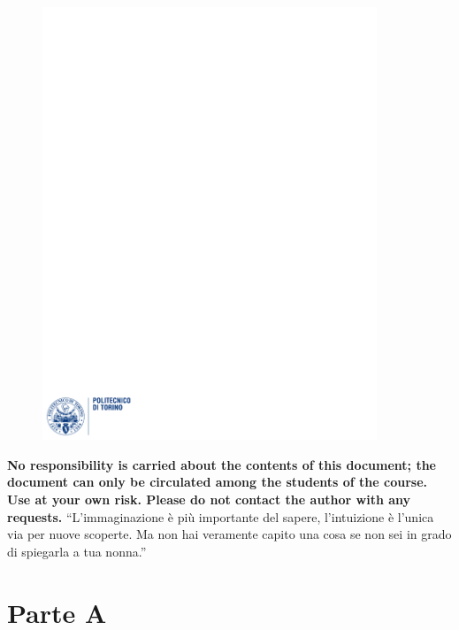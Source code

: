 \documentclass[12pt]{article}
\begin{document}
\begin{figure}
  \centering
  \includegraphics[width=10cm]{images/polito.pdf}
\end{figure}

\maketitle
\bigskip
\bigskip
\noindent \textbf{No responsibility is carried about the contents of this document; the document can only be circulated among the students of the course. Use at your own risk. Please do not contact the author with any requests.}
\newpage
\tableofcontents
\bigskip
\bigskip
``L'immaginazione è più importante del sapere, l'intuizione è l'unica via per nuove scoperte. Ma non hai veramente capito una cosa se non sei in grado di spiegarla a tua nonna.''\\
\newpage

\section{Parte A}
\end{document}
